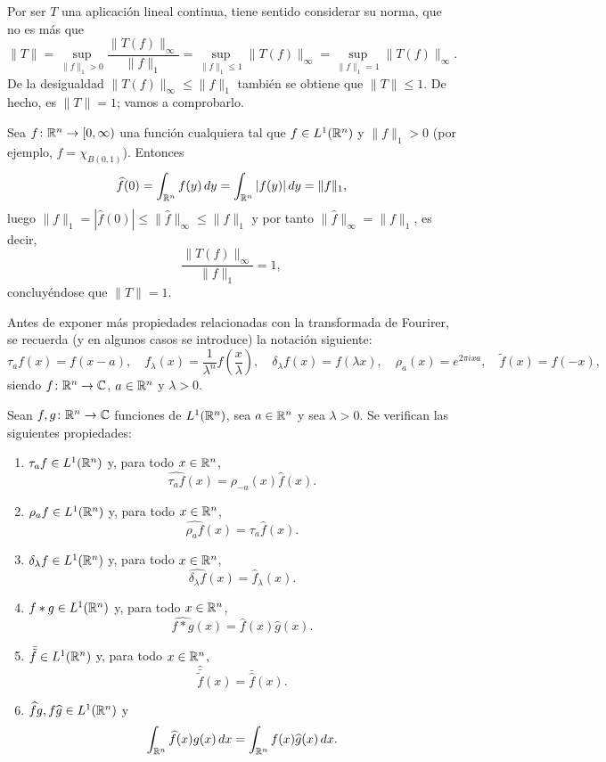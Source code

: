 \documentclass[a4paper, 11pt, oneside]{report}
\begin{document}
Por ser $T$ una aplicación lineal continua, tiene sentido considerar su norma, que no es más que
\[\|T\| = \sup_{\|f\|_1 > 0} \frac{\|T(f)\|_\infty}{\|f\|_1} = \sup_{\|f\|_1 \leq 1} \|T(f)\|_\infty = \sup_{\|f\|_1 = 1} \|T(f)\|_\infty.\]
De la desigualdad $\|T(f)\|_\infty \leq \|f\|_1$ también se obtiene que $\|T\| \leq 1$. De hecho, es $\|T\|=1$; vamos a comprobarlo.

Sea $f \colon \mathbb R^n \to [0,\infty)$ una función cualquiera tal que $f \in L^1(\mathbb R^n)$ y $\|f\|_1 >0$ (por ejemplo, $f = \chi_{B(0,1)}$). Entonces
\[\widehat{f}(0) = \int_{\mathbb R^n} f(y) \, dy = \int_{\mathbb R^n} |f(y)| \, dy = \|f\|_1,\]
luego $\|f\|_1 = |\widehat{f}(0)| \leq \|\widehat{f}\|_\infty \leq \|f\|_1$ y por tanto $\|\widehat{f}\|_\infty = \|f\|_1$, es decir,
\[\frac{\|T(f)\|_\infty}{\|f\|_1} = 1,\]
concluyéndose que $\|T\|=1$.

Antes de exponer más propiedades relacionadas con la transformada de Fourirer, se recuerda (y en algunos casos se introduce) la notación siguiente:
\[\tau_af(x)=f(x-a), \quad f_\lambda(x)= \frac{1}{\lambda^n}f\left(\frac{x}{\lambda}\right), \quad \delta_\lambda f(x) = f(\lambda x), \quad \rho_a(x) = e^{2\pi i xa}, \quad \widetilde{f}(x)=f(-x),\]
siendo $f \colon \mathbb R^n \to \mathbb C$, $a \in \mathbb R^n$ y $\lambda > 0$.

\begin{proposition}\label{pro:3.1.5}
  Sean $f,g\colon \mathbb R^n \to \mathbb C$ funciones de $L^1(\mathbb R^n)$, sea $a \in \mathbb R^n$ y sea $\lambda >0$. Se verifican las siguientes propiedades:
  \begin{enumerate}
    \item $\tau_af\in L^1(\mathbb R^n)$ y, para todo $x \in \mathbb R^n$,
    \[\widehat{\tau_af}(x) = \rho_{-a}(x)\widehat{f}(x).\]
    \item $\rho_a f \in L^1(\mathbb R^n)$ y, para todo $x \in \mathbb R^n$,
    \[\widehat{\rho_af}(x) = \tau_a\widehat{f}(x).\]
    \item $\delta_\lambda f \in L^1(\mathbb R^n)$ y, para todo $x \in \mathbb R^n$,
    \[\widehat{\delta_\lambda f}(x) = \widehat{f}_\lambda(x).\]
    \item $f \ast g \in L^1(\mathbb R^n)$ y, para todo $x\in \mathbb R^n$,
    \[\widehat{f \ast g}(x) = \widehat{f}(x)\widehat{g}(x).\]
    \item $\bar{\tilde{f}}\in L^1(\mathbb R^n)$ y, para todo $x \in \mathbb R^n$,
    \[\hat{\bar{\tilde{f}}}(x)=\bar{\hat{f}}(x).\]
    \item $\widehat{f}g, f\widehat{g}\in L^1(\mathbb R^n)$ y
    \[\int_{\mathbb R^n} \widehat{f}(x)g(x) \, dx = \int_{\mathbb R^n} f(x)\widehat{g}(x) \, dx.\]
  \end{enumerate}
\end{proposition}
\end{document}
